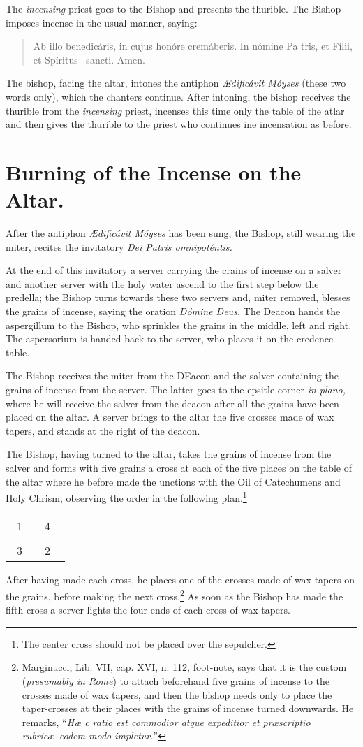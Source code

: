 \documentclass[letterpaper]{report}
\newcommand\blessincense{
\begin{quote}
   Ab illo benedicáris, in cujus honóre cremáberis. In nómine Pa\cross
    tris, et Fí\cross lii, et Spíritus \cross\ sancti. \rbar Amen.
\end{quote}
}
\newcommand\crossplan{
\begin{center}
    \begin{tabular}{ | l c r | }
       \hline
        \cross\ {\small 1} &        & {\small 4} \cross\ \\
                           & \cross &           \\
        \cross\ {\small 3} &        & {\small 2} \cross\ \\
       \hline
   \end{tabular} 
\end{center}
}
\begin{document}
{\rubric The \textit{incensing} priest goes to the Bishop and presents the
thurible. The Bishop imposes incense in the usual manner, saying:

\blessincense

The bishop, facing the altar, intones the antiphon \textit{\AE dificávit
Móyses} (these two words only), which the chanters continue. After intoning,
the bishop receives the thurible from the \textit{incensing} priest, incenses
this time only the table of the atlar and then gives the thurible to the priest
who continues ine incensation as before.

\section{Burning of the Incense on the Altar.}

\rubric After the antiphon \textit{\AE dificávit Móyses} has been sung, the
Bishop, still wearing the miter, recites the invitatory \textit{Dei Patris
omnipoténtis.}

\rubric At the end of this invitatory a server carrying the crains of incense
on a salver and another server with the holy water ascend to the first step
below the predella; the Bishop turns towards these two servers and, miter
removed, blesses the grains of incense, saying the oration \textit{Dómine
Deus.} The Deacon hands the aspergillum to the Bishop, who sprinkles the grains in
the middle, left and right. The aspersorium is handed back to the server, who
places it on the credence table.

The Bishop receives the miter from the DEacon and the salver containing the
grains of incense from the server. The latter goes to the epsitle corner
\textit{in plano,} where he will receive the salver from the deacon after all
the grains have been placed on the altar. A server brings to the altar the five
crosses made of wax tapers, and stands at the right of the deacon.

\rubric The Bishop, having turned to the altar, takes the grains of incense
from the salver and forms with five grains a cross at each of the five places
on the table of the altar where he before made the unctions with the Oil of
Catechumens and Holy Chrism, observing the order in the following
plan.\footnote{The center cross should not be placed over the sepulcher.}

\crossplan

After having made each cross, he places one of the crosses made of wax tapers
on the grains, before making the next cross.\footnote{Marginucci, Lib. VII,
cap. XVI, n. 112, foot-note, says that it is the custom (\textit{presumably in
Rome}) to attach beforehand five grains of incense to the crosses made of wax
tapers, and then the bishop needs only to place the taper-crosses at their
places with the grains of incense turned downwards. He remarks, ``\textit{H\ae
c ratio est commodior atque expeditior et pr\ae scriptio rubric\ae\ eodem modo
impletur.}''} As soon as the Bishop has made the fifth cross a server lights
the four ends of each cross of wax tapers.

}
\end{document}
